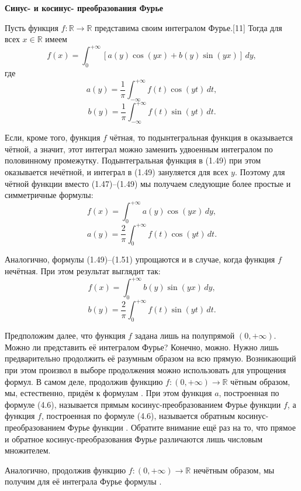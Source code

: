    
\textbf{Синус- и косинус- преобразования Фурье}
 {
  
Пусть функция \( f : \mathbb{R} \to \mathbb{R} \) представима своим интегралом Фурье.[11]  Тогда для всех \( x \in \mathbb{R} \) имеем
\[
f(x) = \int_0^{+\infty} [a(y) \cos(yx) + b(y) \sin(yx)] \, dy, \tag{1.47}
\]
где
\[
a(y) = \frac{1}{\pi} \int_{-\infty}^{+\infty} f(t) \cos(yt) \, dt, \tag{1.48}
\]
\[
b(y) = \frac{1}{\pi} \int_{-\infty}^{+\infty} f(t) \sin(yt) \, dt. \tag{1.49}
\]

Если, кроме того, функция \( f \) чётная, то подынтегральная функция в  оказывается чётной, а значит, этот интеграл можно заменить удвоенным интегралом по половинному промежутку. Подынтегральная функция в (1.49) при этом оказывается нечётной, и интеграл в (1.49) зануляется для всех \( y \). Поэтому для чётной функции вместо (1.47)–(1.49) мы получаем следующие более простые и симметричные формулы:
\[
f(x) = \int_0^{+\infty} a(y) \cos(yx) \, dy, \tag{1.50}
\]
\[
a(y) = \frac{2}{\pi} \int_0^{+\infty} f(t) \cos(yt) \, dt. \tag{1.51}
\]

Аналогично, формулы (1.49)–(1.51) упрощаются и в случае, когда функция \( f \) нечётная. При этом результат выглядит так:
\[
f(x) = \int_0^{+\infty} b(y) \sin(yx) \, dy,  \tag{1.52}
\]
\[
b(y) = \frac{2}{\pi} \int_0^{+\infty} f(t) \sin(yt) \, dt. \tag{1.43}
\]

Предположим далее, что функция \( f \) задана лишь на полупрямой \( (0, +\infty) \). Можно ли представить её интегралом Фурье? Конечно, можно. Нужно лишь предварительно продолжить её разумным образом на всю прямую. Возникающий при этом произвол в выборе продолжения можно использовать для упрощения формул. В самом деле, продолжив функцию \( f : (0, +\infty) \to \mathbb{R} \) чётным образом, мы, естественно, придём к формулам . При этом функция \( a \), построенная по формуле (4.6), называется прямым косинус-преобразованием Фурье функции \( f \), а функция \( f \), построенная по формуле (4.6), называется обратным косинус-преобразованием Фурье функции . Обратите внимание ещё раз на то, что прямое и обратное косинус-преобразования Фурье различаются лишь числовым множителем.

Аналогично, продолжив функцию \( f : (0, +\infty) \to \mathbb{R} \) нечётным образом, мы получим для её интеграла Фурье формулы .

 }
